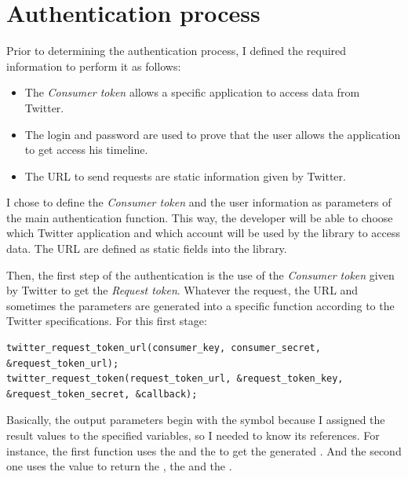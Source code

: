 \section{Authentication process}

\hspace{15mm}Prior to determining the authentication process, I defined the required information to perform it as follows:
\begin{itemize}
\item The \textit{Consumer token} allows a specific application to access data from Twitter.
\item The login and password are used to prove that the user allows the application to get access his timeline.
\item The URL to send requests are static information given by Twitter.
\end{itemize}
I chose to define the \textit{Consumer token} and the user information as parameters of the main authentication function. This way, the developer will be able to choose which Twitter application and which account will be used by the library to access data. The URL are defined as static fields into the library.

Then, the first step of the authentication is the use of the \textit{Consumer token} given by Twitter to get the \textit{Request token}. Whatever the request, the URL and sometimes the parameters are generated into a specific function according to the Twitter specifications. For this first stage:
\begin{lstlisting}
twitter_request_token_url(consumer_key, consumer_secret, &request_token_url);
twitter_request_token(request_token_url, &request_token_key, &request_token_secret, &callback);
\end{lstlisting}
Basically, the output parameters begin with the \cfunction{\&} symbol because I assigned the result values to the specified variables, so I needed to know its references. For instance, the first function uses the  and the  to get the generated . And the second one uses the  value to return the , the  and the .

